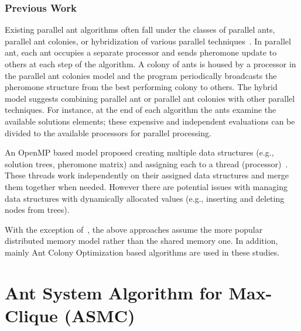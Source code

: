 \documentclass[11pt]{article}
\begin{document}
\subsubsection{Previous Work}

Existing parallel ant algorithms often fall under the classes of parallel ants, parallel ant colonies, or hybridization of various parallel techniques~\cite{TRFR,RL,CR,B1,MRS,DHKLR,Stutzle,MBSD}.  In parallel ant, each ant occupies a separate processor and sends pheromone update to others at each step of the algorithm. A colony of ants is housed by a processor in the parallel ant colonies model and the program periodically broadcasts the pheromone structure from the best performing colony to others.  The hybrid model suggests combining parallel ant or parallel ant colonies with other parallel techniques. For instance, at the end of each algorithm the ants examine the available solutions elements; these expensive and independent evaluations can be divided to the available processors for parallel processing.

An OpenMP based model proposed creating multiple data structures (e.g., solution trees,  pheromone matrix) and assigning each to a thread (processor)~\cite{PKGG}.  These threads work independently on their assigned data structures and merge them together when needed.  However there are potential issues with managing data structures with dynamically allocated values (e.g., inserting and deleting nodes from trees).

With the exception of~\cite{PKGG}, the above approaches assume the more popular distributed memory model rather than the shared memory one. In addition, mainly Ant Colony Optimization based algorithms are used in these studies.



\section{Ant System Algorithm for Max-Clique (ASMC)}\label{algorithm}
\end{document}
